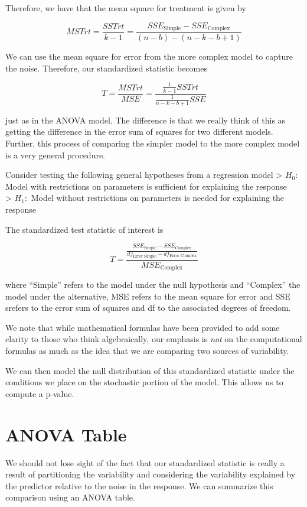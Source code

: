 \documentclass[]{book}
\theoremstyle{plain}
\theoremstyle{mydefn}
\theoremstyle{myexmpl}
\theoremstyle{remark}
\let\BeginKnitrBlock\begin \let\EndKnitrBlock\end
\let\BeginKnitrBlock\begin \let\EndKnitrBlock\end
\begin{document}
Therefore, we have that the mean square for treatment is given by

\[MSTrt = \frac{SSTrt}{k - 1} = \frac{SSE_{\text{Simple}} - SSE_{\text{Complex}}}{(n - b) - (n - k - b + 1)}\]

We can use the mean square for error from the more complex model to
capture the noise. Therefore, our standardized statistic becomes

\[T = \frac{MSTrt}{MSE} = \frac{\frac{1}{k-1} SSTrt}{\frac{1}{n-k-b+1} SSE}\]

just as in the ANOVA model. The difference is that we really think of
this as getting the difference in the error sum of squares for two
different models. Further, this process of comparing the simpler model
to the more complex model is a very general procedure.

\BeginKnitrBlock{rmdtip}
Consider testing the following general hypotheses from a regression
model \textgreater{} \(H_0:\) Model with restrictions on parameters is
sufficient for explaining the response\\
\textgreater{} \(H_1:\) Model without restrictions on parameters is
needed for explaining the response

The standardized test statistic of interest is

\[T = \frac{\frac{SSE_{\text{Simple}} - SSE_{\text{Complex}}}{df_{\text{Error Simple}} - df_{\text{Error Complex}}}}{MSE_{\text{Complex}}}
\]

where ``Simple'' refers to the model under the null hypothesis and
``Complex'' the model under the alternative, MSE refers to the mean
square for error and SSE srefers to the error sum of squares and df to
the associated degrees of freedom.
\EndKnitrBlock{rmdtip}

We note that while mathematical formulas have been provided to add some
clarity to those who think algebraically, our emphasis is \emph{not} on
the computational formulas as much as the idea that we are comparing two
sources of variability.

We can then model the null distribution of this standardized statistic
under the conditions we place on the stochastic portion of the model.
This allows us to compute a p-value.

\section{ANOVA Table}\label{anova-table-1}

We should not lose sight of the fact that our standardized statistic is
really a result of partitioning the variability and considering the
variability explained by the predictor relative to the noise in the
response. We can summarize this comparison using an ANOVA table.
\end{document}
